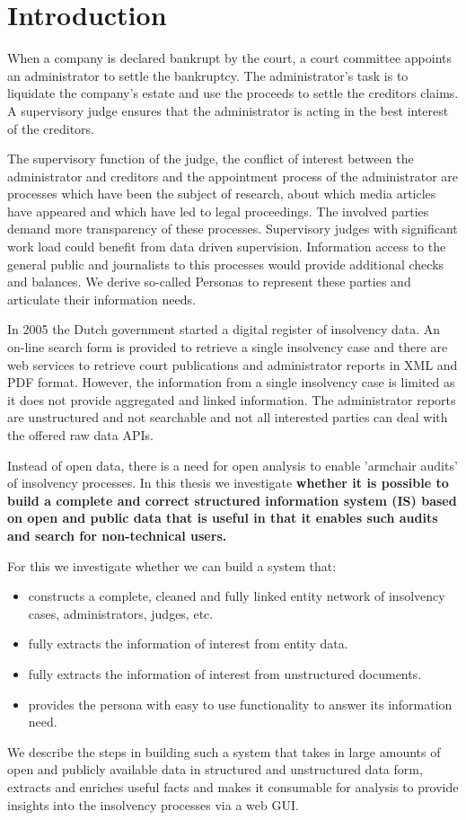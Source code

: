 \section{Introduction}
When a company is declared bankrupt by the court, a court committee appoints an administrator to settle the bankruptcy. The administrator's task is to liquidate the company's estate and use the proceeds to settle the creditors claims. A supervisory judge ensures that the administrator is acting in the best interest of the creditors. 

The supervisory function of the judge, the conflict of interest between the administrator and creditors and the appointment process of the administrator are processes which have been the subject of research\cite{boluk_2011}, about which media articles have appeared \cite{dennis_meneer_2018:1, dennis_meneer_2017:1, jan-hein_strop_2015:1} and which have led to legal proceedings.  The involved parties demand more transparency of these processes. Supervisory judges with significant work load could benefit from data driven supervision. Information access to the general public and journalists to this processes  would provide additional checks and balances. We derive so-called Personas to represent these parties and articulate their information needs.

In 2005 the Dutch government started a digital register of insolvency data\cite{rechtspraak:cir}. An on-line search form \cite{rechtspraak:cir-zoeken} is provided to retrieve a single insolvency case and there are web services to retrieve court publications and administrator reports in XML and PDF format. However, the information from a single insolvency case is limited as it does not provide aggregated and linked information. The administrator reports are unstructured and not searchable and not all interested parties can deal with the offered raw data APIs. 

Instead of open data, there is a need for open analysis to enable 'armchair audits'\cite{o_leary_2015} of insolvency processes. In this thesis we investigate \textbf{whether it is possible to build a complete and correct structured information system (IS) based on open and public data that is useful in that it enables such audits and search for non-technical users.}

For this we investigate whether we can build a system that:
\begin{itemize}
	\item constructs a complete, cleaned and fully linked entity network of insolvency cases, administrators, judges, etc.
	\item fully extracts the information of interest from entity data.
	\item fully extracts the information of interest from unstructured documents.
	\item provides the persona with easy to use functionality to answer its information need.
\end{itemize}

We describe the steps in building such a system that takes in large amounts of open and publicly available data in structured and unstructured data form, extracts and enriches useful facts and makes it consumable for analysis to provide insights into the insolvency processes via a web GUI.
